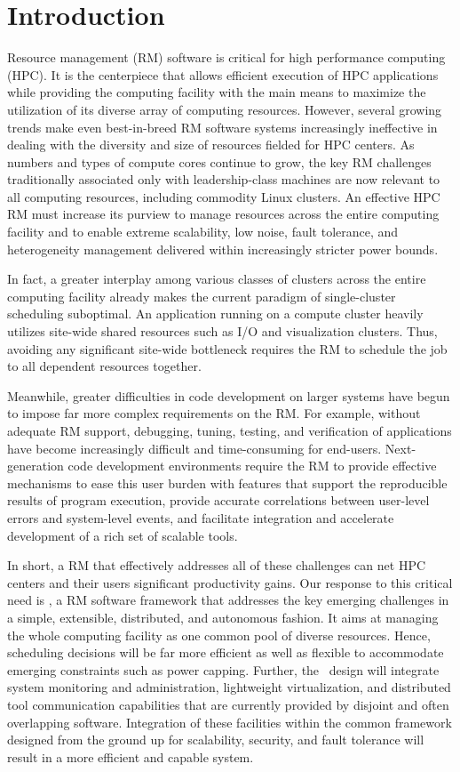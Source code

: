 \section{Introduction}

Resource management (RM) software is critical
for high performance computing (HPC).
It is the centerpiece that allows efficient
execution of HPC applications while providing
the computing facility with the main means
to maximize the utilization of its diverse array of computing
resources.
However, several growing trends make even
best-in-breed RM software systems increasingly ineffective
in dealing with the diversity and size of resources fielded for HPC centers.
As numbers and types of compute cores
continue to grow, the key RM challenges traditionally associated only
with leadership-class machines are now
relevant to all computing resources, including
commodity Linux clusters. An effective HPC RM must increase
its purview to manage resources across the entire
computing facility and to enable extreme scalability,
low noise, fault tolerance,
and heterogeneity management delivered within increasingly
stricter power bounds.

In fact, a greater interplay among various classes
of clusters across the entire computing facility already 
makes the current paradigm of single-cluster scheduling
suboptimal. An application running on a compute
cluster heavily utilizes site-wide shared resources
such as I/O and visualization clusters.
Thus, avoiding any significant site-wide bottleneck
requires the RM to schedule the job to all dependent
resources together.

Meanwhile, greater difficulties in code development
on larger systems have begun to impose far more complex
requirements on the RM. For example, without adequate
RM support, debugging, tuning, testing, and verification
of applications have become increasingly difficult
and time-consuming for end-users.
Next-generation code development environments
require the RM to provide effective mechanisms
to ease this user burden with features that support the reproducible results of program execution,
provide accurate correlations between user-level errors
and system-level events,
and facilitate integration and accelerate development of a rich set of scalable tools.

In short, a RM that effectively
addresses all of these challenges can net HPC centers
and their users significant productivity gains.
Our response to this critical need is \flux,
a RM software framework that addresses the key emerging
challenges in a simple, extensible, distributed,
and autonomous fashion.
It aims at managing the whole computing facility
as one common pool of diverse resources.
Hence, scheduling decisions will be far more efficient
as well as flexible to accommodate emerging constraints
such as power capping.
Further, the \flux\ design will integrate system monitoring and
administration, lightweight virtualization, 
and distributed tool communication capabilities 
that are currently provided by disjoint
and often overlapping software. 
Integration of these facilities within the common framework
designed from the ground up for scalability, security,
and fault tolerance will result in a more efficient
and capable system.

